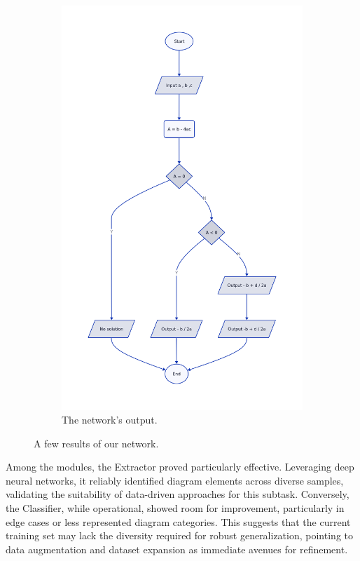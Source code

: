 \documentclass[conference]{IEEEtran}
\begin{document}
\begin{figure}[htbp]
\begin{subfigure}[b]{0.45\linewidth}
		\includegraphics[width=\linewidth]{ex6.png}
		\caption{The network's output.}
	\end{subfigure}
	
	\caption{A few results of our network.}
	\label{fig:results}
\end{figure}

Among the modules, the Extractor proved particularly effective. Leveraging deep neural networks, it reliably identified diagram elements across diverse samples, validating the suitability of data-driven approaches for this subtask. Conversely, the Classifier, while operational, showed room for improvement, particularly in edge cases or less represented diagram categories. This suggests that the current training set may lack the diversity required for robust generalization, pointing to data augmentation and dataset expansion as immediate avenues for refinement.
\end{document}
